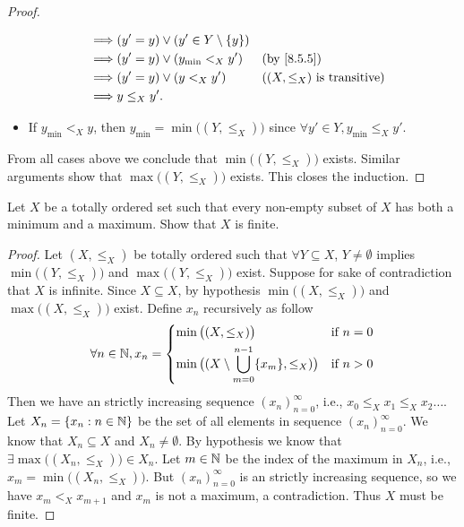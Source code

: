\begin{proof}
\begin{itemize}
\begin{align*}
            \implies & (y' = y) \lor (y' \in Y \setminus \set{y})                                             \\
            \implies & (y' = y) \lor (y_{\min} <_X y')            &  & \by{8.5.5}                             \\
            \implies & (y' = y) \lor (y <_X y')                   &  & \text{(\((X, \leq_X)\) is transitive)} \\
            \implies & y \leq_X y'.
          \end{align*}
    \item If \(y_{\min} <_X y\), then \(y_{\min} = \min\big((Y, \leq_X)\big)\) since \(\forall y' \in Y, y_{\min} \leq_X y'\).
  \end{itemize}
  From all cases above we conclude that \(\min\big((Y, \leq_X)\big)\) exists.
  Similar arguments show that \(\max\big((Y, \leq_X)\big)\) exists.
  This closes the induction.
\end{proof}

\begin{ex}\label{ex:8.5.9}
  Let \(X\) be a totally ordered set such that every non-empty subset of \(X\) has both a minimum and a maximum.
  Show that \(X\) is finite.
\end{ex}

\begin{proof}
  Let \((X, \leq_X)\) be totally ordered such that \(\forall Y \subseteq X\), \(Y \neq \emptyset\) implies \(\min\big((Y, \leq_X)\big)\) and \(\max\big((Y, \leq_X)\big)\) exist.
  Suppose for sake of contradiction that \(X\) is infinite.
  Since \(X \subseteq X\), by hypothesis \(\min\big((X, \leq_X)\big)\) and \(\max\big((X, \leq_X)\big)\) exist.
  Define \(x_n\) recursively as follow
  \[
    \forall n \in \N, x_n = \begin{dcases}
      \min\big((X, \leq_X)\big)                                             & \text{if } n = 0 \\
      \min\big((X \setminus \bigcup_{m = 0}^{n - 1} \set{x_m}, \leq_X)\big) & \text{if } n > 0
    \end{dcases}
  \]
  Then we have an strictly increasing sequence \((x_n)_{n = 0}^\infty\), i.e., \(x_0 \leq_X x_1 \leq_X x_2 \dots\).
  Let \(X_n = \left\lbrace x_n : n \in \mathbb{N}\right\rbrace\) be the set of all elements in sequence \((x_n)_{n = 0}^\infty\).
  We know that \(X_n \subseteq X\) and \(X_n \neq \emptyset\).
  By hypothesis we know that \(\exists \max\big((X_n, \leq_X)\big) \in X_n\).
  Let \(m \in \mathbb{N}\) be the index of the maximum in \(X_n\), i.e., \(x_m = \min\big((X_n, \leq_X)\big)\).
  But \((x_n)_{n = 0}^\infty\) is an strictly increasing sequence, so we have \(x_m <_X x_{m + 1}\) and \(x_m\) is not a maximum, a contradiction.
  Thus \(X\) must be finite.
\end{proof}

